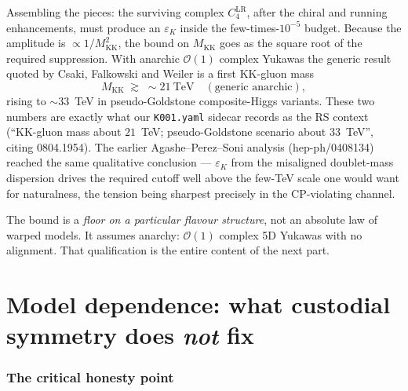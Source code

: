 \documentclass[11pt]{article}
\newcommand{\MKK}{M_{\mathrm{KK}}}
\newcommand{\epsK}{\varepsilon_K}
\newcommand{\code}[1]{\texttt{#1}}
\theoremstyle{definition}
\begin{document}
Assembling the pieces: the surviving complex $C_4^{\mathrm{LR}}$, after the chiral
and running enhancements, must produce an $\epsK$ inside the few-times-$10^{-5}$
budget. Because the amplitude is $\propto1/\MKK^2$, the bound on $\MKK$ goes as the
square root of the required suppression. With anarchic $\mathcal{O}(1)$ complex
Yukawas the generic result quoted by Csaki, Falkowski and Weiler is a first
KK-gluon mass
\begin{equation}
\MKK \;\gtrsim\; \sim 21~\text{TeV} \quad(\text{generic anarchic}),
\label{eq:21tev}
\end{equation}
rising to $\sim33$~TeV in pseudo-Goldstone composite-Higgs variants. These two
numbers are exactly what our \code{K001.yaml} sidecar records as the RS context
(``KK-gluon mass about $21$~TeV; pseudo-Goldstone scenario about $33$~TeV'',
citing 0804.1954). The earlier Agashe--Perez--Soni analysis (hep-ph/0408134)
reached the same qualitative conclusion --- $\epsK$ from the misaligned
doublet-mass dispersion drives the required cutoff well above the few-TeV scale
one would want for naturalness, the tension being sharpest precisely in the
CP-violating channel.

The bound is a \emph{floor on a particular flavour structure}, not an absolute
law of warped models. It assumes anarchy: $\mathcal{O}(1)$ complex 5D Yukawas with
no alignment. That qualification is the entire content of the next part.

\part{Model dependence: what custodial symmetry does \emph{not} fix}
\label{part:cust}

\section{The critical honesty point}
\label{sec:honesty}
\end{document}
